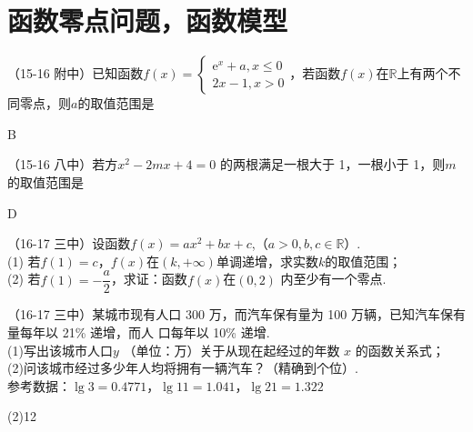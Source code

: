 \section{函数零点问题，函数模型}
\begin{exercise}{}
\item
（15-16 附中）已知函数$f(x)=\begin{cases}\mathrm{e}^x+a,x\leq0\\2x-1,x>0 \end{cases} $，若函数$f(x)$在$\mathbb{R}$上有两个不同零点，则$a$的取值范围是\xz
\xx{$[-1,+\infty)$}{$(-1,+\infty)$}{$(-1,0)$}{$[-1,0)$}
\begin{answer}
  B
\end{answer}
\item
（15-16 八中）若方$x^2-2mx+4=0$ 的两根满足一根大于 1，一根小于 1，则$m$ 的取值范围是\xz
{}
\begin{answer}
  D
\end{answer}
\item
（16-17 三中）设函数$f(x)=ax^2+bx+c$,（$a>0,b,c\in\mathbb{R}$）.\\
(1) 若$f(1)=c$，$f(x)$在$(k,+\infty)$单调递增，求实数$k$的取值范围；\\
(2) 若$f(1)=-\dfrac a2$，求证：函数$f(x)$在$(0,2)$ 内至少有一个零点.
\vspace{15em}
\item
（16-17 三中）某城市现有人口 300 万，而汽车保有量为 100 万辆，已知汽车保有量每年以 21\% 递增，而人 口每年以 10\% 递增.\\
(1)写出该城市人口$y$ （单位：万）关于从现在起经过的年数 $x$ 的函数关系式；\\ (2)问该城市经过多少年人均将拥有一辆汽车？（精确到个位）.\\
参考数据：$\lg3=0.4771$，$\lg11=1.041$，$\lg21=1.322$
\begin{answer}
  (2)12
\end{answer}
\vspace{14em}
\end{exercise}
